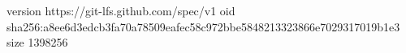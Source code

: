 version https://git-lfs.github.com/spec/v1
oid sha256:a8ee6d3edcb3fa70a78509eafec58c972bbe5848213323866e7029317019b1e3
size 1398256
